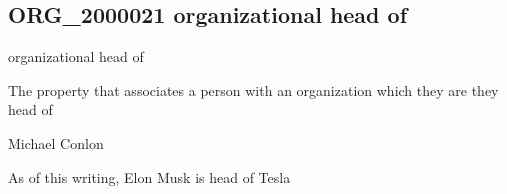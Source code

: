 \documentclass[letterpaper,10pt,english]{sphinxmanual}
\begin{document}
\subsection{ORG\_2000021 \sphinxhyphen{} organizational head of}
\label{\detokenize{doc-ORG_2000021:org-2000021-organizational-head-of}}\label{\detokenize{doc-ORG_2000021:index-0}}\label{\detokenize{doc-ORG_2000021::doc}}
\begin{sphinxShadowBox}

\sphinxAtStartPar
organizational head of
\end{sphinxShadowBox}

\begin{sphinxShadowBox}

\sphinxAtStartPar
{}
\end{sphinxShadowBox}

\begin{sphinxShadowBox}

\sphinxAtStartPar
The property that associates a person with an organization which they are they head of
\end{sphinxShadowBox}

\begin{sphinxShadowBox}

\sphinxAtStartPar
Michael Conlon 
\end{sphinxShadowBox}

\begin{sphinxShadowBox}

\sphinxAtStartPar
{\hyperref[\detokenize{doc-NCBITaxon_9606::doc}]{}}
\end{sphinxShadowBox}

\begin{sphinxShadowBox}

\sphinxAtStartPar
{\hyperref[\detokenize{doc-ORG_0000001::doc}]{}}
\end{sphinxShadowBox}

\begin{sphinxShadowBox}

\sphinxAtStartPar
As of this writing, Elon Musk is head of Tesla
\end{sphinxShadowBox}
\end{document}
